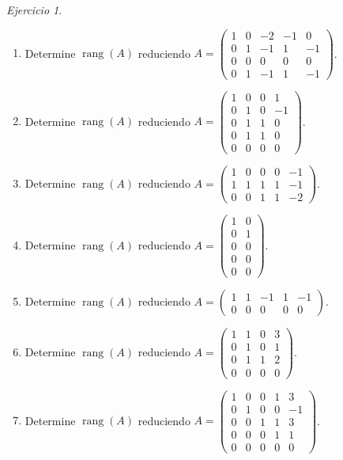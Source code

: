 \documentclass[12pt]{article}
\theoremstyle{remark}
\newtheorem{Ejer}[definicion]{Ejercicio}
\newcommand{\rang}{\operatorname{rang}}
\begin{document}
\begin{Ejer}
\begin{enumerate}[start=197]
\item Determine $\rang(A)$ reduciendo $A=\begin{pmatrix}1&0&-2&-1&0\\0&1&-1&1&-1\\0&0&0&0&0\\0&1&-1&1&-1\end{pmatrix}$.

\item Determine $\rang(A)$ reduciendo $A=\begin{pmatrix}1&0&0&1\\0&1&0&-1\\0&1&1&0\\0&1&1&0\\0&0&0&0\end{pmatrix}$.

\item Determine $\rang(A)$ reduciendo $A=\begin{pmatrix}1&0&0&0&-1\\1&1&1&1&-1\\0&0&1&1&-2\end{pmatrix}$.

\item Determine $\rang(A)$ reduciendo $A=\begin{pmatrix}1&0\\0&1\\0&0\\0&0\\0&0\end{pmatrix}$.

\item Determine $\rang(A)$ reduciendo $A=\begin{pmatrix}1&1&-1&1&-1\\0&0&0&0&0\end{pmatrix}$.

\item Determine $\rang(A)$ reduciendo $A=\begin{pmatrix}1&1&0&3\\0&1&0&1\\0&1&1&2\\0&0&0&0\end{pmatrix}$.

\item Determine $\rang(A)$ reduciendo $A=\begin{pmatrix}1&0&0&1&3\\0&1&0&0&-1\\0&0&1&1&3\\0&0&0&1&1\\0&0&0&0&0\end{pmatrix}$.


\end{enumerate}
\end{Ejer}
\end{document}
